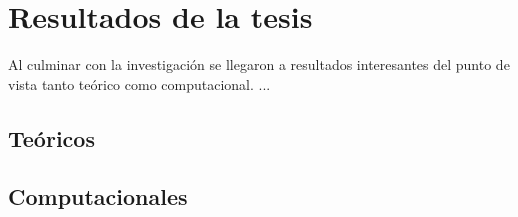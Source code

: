 \chapter{Resultados de la tesis}
\setcounter{page}{20}
\renewcommand{\baselinestretch}{2} %

Al culminar con la investigación se llegaron a resultados interesantes del punto de vista tanto teórico como computacional. ...

\section{Teóricos}
\section{Computacionales}


